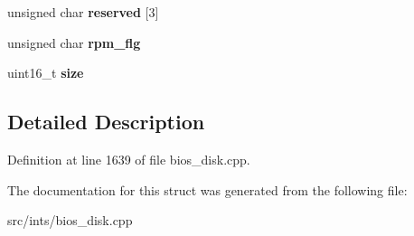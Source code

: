 \begin{DoxyCompactItemize}
\item 
\hypertarget{structD88SEC_ae71af3325f276f748b4966972fd3832c}{unsigned char {\bfseries reserved} \mbox{[}3\mbox{]}}\label{structD88SEC_ae71af3325f276f748b4966972fd3832c}

\item 
\hypertarget{structD88SEC_a2bfa52815aee40f7c5383a0a51175aa3}{unsigned char {\bfseries rpm\-\_\-flg}}\label{structD88SEC_a2bfa52815aee40f7c5383a0a51175aa3}

\item 
\hypertarget{structD88SEC_af830ea69e2aa174d018743dfbc12edce}{uint16\-\_\-t {\bfseries size}}\label{structD88SEC_af830ea69e2aa174d018743dfbc12edce}

\end{DoxyCompactItemize}


\subsection{Detailed Description}


Definition at line 1639 of file bios\-\_\-disk.\-cpp.



The documentation for this struct was generated from the following file\-:\begin{DoxyCompactItemize}
\item 
src/ints/bios\-\_\-disk.\-cpp\end{DoxyCompactItemize}

